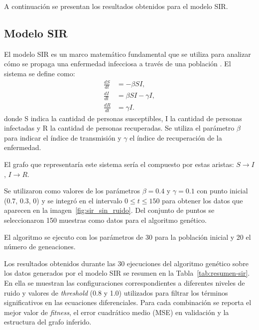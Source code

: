A continuación se presentan los resultados obtenidos para el modelo SIR.

\subsection{Modelo SIR}

El modelo SIR es un marco matemático fundamental que se utiliza para analizar cómo se propaga una enfermedad infecciosa a través de una población \cite{Kermack1927}. El sistema se define como:
\[
\begin{aligned}
\frac{dS}{dt} &= -\beta SI, \\
\frac{dI}{dt} &= \beta SI - \gamma I, \\
\frac{dR}{dt} &= \gamma I.
\end{aligned}
\]
donde S indica la cantidad de personas susceptibles, I la cantidad de personas infectadas y R la cantidad de personas recuperadas. Se utiliza el parámetro $\beta$ para indicar el índice de transmisión y $\gamma$ el índice de recuperación de la enfermedad.

El grafo que representar\'ia este sistema ser\'ia el compuesto por estas aristas: $S \rightarrow I$, $I \rightarrow R$.

Se utilizaron como valores de los parámetros $\beta = 0.4$ y $\gamma = 0.1$ con punto inicial (0.7, 0.3, 0) y se integró en el intervalo $0 \leq t \leq 150$ para obtener los datos que aparecen en la imagen~\ref{fig:sir_sin_ruido}. Del conjunto de puntos se seleccionaron 150 muestras como datos para el algoritmo gen\'etico. 

El algoritmo se ejecuto con los par\'ametros de 30 para la poblaci\'on inicial y 20 el n\'umero de geneaciones.

Los resultados obtenidos durante las 30 ejecuciones del algoritmo genético sobre los datos generados por el modelo SIR se resumen en la Tabla~\ref{tab:resumen-sir}. En ella se muestran las configuraciones correspondientes a diferentes niveles de ruido y valores de \textit{threshold} (0.8 y 1.0) utilizados para filtrar los términos significativos en las ecuaciones diferenciales. Para cada combinación se reporta el mejor valor de \textit{fitness}, el error cuadrático medio (MSE) en validación y la estructura del grafo inferido.

